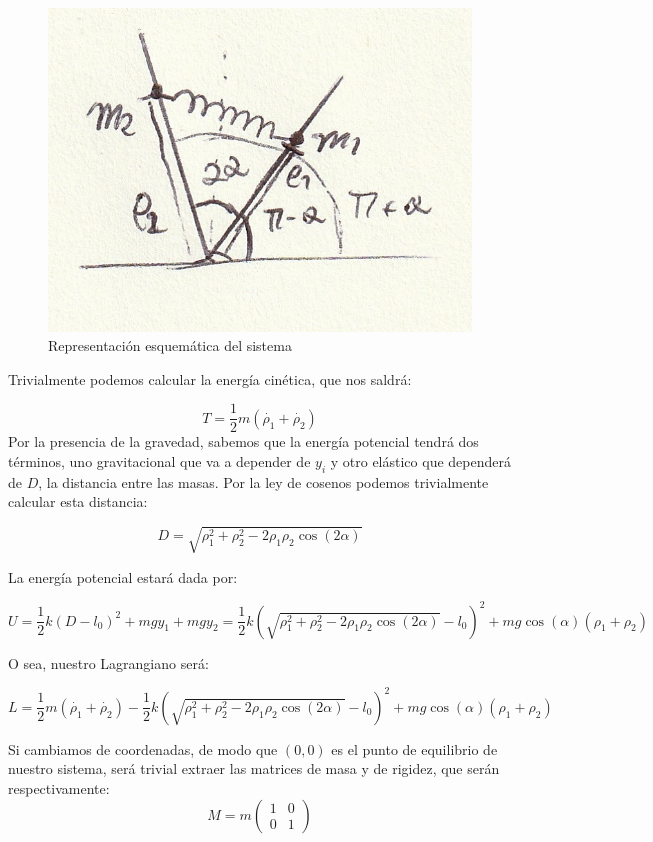 \documentclass[a4paper,12pt]{article}
\begin{document}
\begin{figure}[h!]
  \centering
  \caption{Representación esquemática del sistema}
  \label{repr}
  \includegraphics{repr.jpg}
\end{figure}
Trivialmente podemos calcular la energía cinética, que nos saldrá:

\begin{equation}
  T = \frac{1}{2}m (\dot{\rho_1} + \dot{\rho_2})
\end{equation}
Por la presencia de la gravedad, sabemos que la energía potencial tendrá dos términos, uno gravitacional que va a depender de $y_i$ y otro elástico que dependerá de $D$, la distancia entre las masas. Por la ley de cosenos podemos trivialmente calcular esta distancia:

$$D =\sqrt{\rho_1^2 + \rho_2^2 -2\rho_1\rho_2\cos{(2\alpha)}} $$


La energía potencial estará dada por:

$$U = \frac{1}{2}k(D-l_0)^2 + mgy_1+mgy_2 = \frac{1}{2}k \left(\sqrt{\rho_1^2 + \rho_2^2 -2\rho_1\rho_2\cos{(2\alpha)}} - l_0\right)^2 + mg\cos{(\alpha)}\left(\rho_1+\rho_2\right)$$




O sea, nuestro Lagrangiano será:

\begin{equation}
  L = \frac{1}{2}m (\dot{\rho_1} + \dot{\rho_2}) - \frac{1}{2}k (\sqrt{\rho_1^2 + \rho_2^2 -2\rho_1\rho_2\cos{(2\alpha)}} - l_0)^2 + mg\cos{(\alpha)}\left(\rho_1+\rho_2\right)
\end{equation}

Si cambiamos de coordenadas, de modo que $(0,0)$ es el punto de equilibrio de nuestro sistema, será trivial extraer las matrices de masa y de rigidez, que serán respectivamente: 
\begin{equation}
  M = m\begin{pmatrix}
    1&0\\0&1
  \end{pmatrix}
\end{equation}
\end{document}
